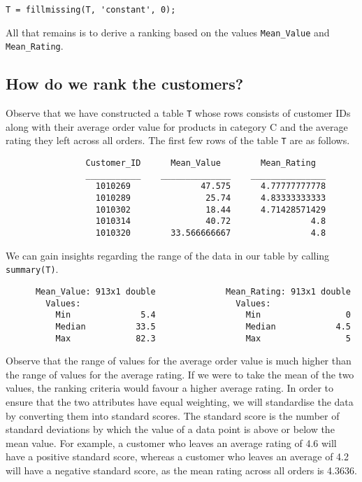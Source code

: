 \begin{lstlisting}
T = fillmissing(T, 'constant', 0);
\end{lstlisting}

\noindent
All that remains is to derive a ranking based on the values \lstinline|Mean_Value| and \lstinline|Mean_Rating|. \\

\subsection{How do we rank the customers?}
Observe that we have constructed a table \lstinline|T| whose rows consists of customer IDs along with their average order value for products in category C and the average rating they left across all orders. The first few rows of the table \lstinline|T| are as follows.

\begin{lstlisting}
                Customer_ID      Mean_Value        Mean_Rating   
                ___________    ______________    _______________
                  1010269              47.575      4.77777777778
                  1010289               25.74      4.83333333333
                  1010302               18.44      4.71428571429
                  1010314               40.72                4.8
                  1010320        33.566666667                4.8  
\end{lstlisting}

\newpage
\noindent
We can gain insights regarding the range of the data in our table by calling \lstinline|summary(T)|.

\begin{lstlisting}
      Mean_Value: 913x1 double              Mean_Rating: 913x1 double            
        Values:                               Values:            
          Min              5.4                  Min                 0                
          Median          33.5                  Median            4.5                
          Max             82.3                  Max                 5    
\end{lstlisting}

\noindent
Observe that the range of values for the average order value is much higher than the range of values for the average rating. If we were to take the mean of the two values, the ranking criteria would favour a higher average rating. In order to ensure that the two attributes have equal weighting, we will standardise the data by converting them into standard scores. The standard score is the number of standard deviations by which the value of a data point is above or below the mean value. For example, a customer who leaves an average rating of 4.6 will have a positive standard score, whereas a customer who leaves an average of 4.2 will have a negative standard score, as the mean rating across all orders is 4.3636. \\


